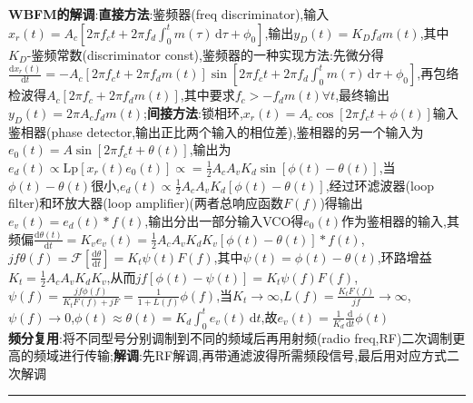 \documentclass[UTF8,a4paper,10pt]{article}
\begin{document}
\begin{multicols}{2}
    \textbf{WBFM的解调}:\textbf{直接方法}:鉴频器(freq discriminator),输入$x_r(t)=A_c[2\pi f_ct+2\pi f_d\int_0^tm(\tau)\,\mathrm{d}\tau+\phi_0]$,输出$y_D(t)=K_Df_dm(t)$,其中$K_D$-鉴频常数(discriminator const),鉴频器的一种实现方法:先微分得$\frac{\mathrm{d}x_r(t)}{\mathrm{d}t}=-A_c[2\pi f_ct+2\pi f_dm(t)]\sin[2\pi f_ct+2\pi f_d\int_0^tm(\tau)\,\mathrm{d}\tau+\phi_0]$,再包络检波得$A_c[2\pi f_c+2\pi f_dm(t)]$,其中要求$f_c>-f_dm(t)\forall t$,最终输出$y_D(t)=2\pi A_cf_dm(t)$;\textbf{间接方法}:锁相环,$x_r(t)=A_c\cos[2\pi f_ct+\phi(t)]$输入鉴相器(phase detector,输出正比两个输入的相位差),鉴相器的另一个输入为$e_0(t)=A\sin[2\pi f_ct+\theta(t)]$,输出为$e_d(t)\propto\text{Lp}[x_r(t)e_0(t)]\propto=\frac{1}{2}A_cA_vK_d\sin[\phi(t)-\theta(t)]$,当$\phi(t)-\theta(t)$很小,$e_d(t)\propto\frac{1}{2}A_cA_vK_d[\phi(t)-\theta(t)]$,经过环滤波器(loop filter)和环放大器(loop amplifier)(两者总响应函数$F(f)$)得输出$e_v(t)=e_d(t)*f(t)$,输出分出一部分输入VCO得$e_0(t)$作为鉴相器的输入,其频偏$\frac{\mathrm{d}\theta(t)}{\mathrm{d}t}=K_ve_v(t)=\frac{1}{2}A_cA_vK_dK_v[\phi(t)-\theta(t)]*f(t)$,$jf\theta(f)=\mathscr{F}[\frac{\mathrm{d}\theta}{\mathrm{d}t}]=K_t\psi(t)F(f)$,其中$\psi(t)=\phi(t)-\theta(t)$,环路增益$K_t=\frac{1}{2}A_cA_vK_dK_v$,从而$jf[\phi(t)-\psi(t)]=K_t\psi(f)F(f)$,$\psi(f)=\frac{jf\phi(f)}{K_tF(f)+jF}=\frac{1}{1+L(f)}\phi(f)$,当$K_t\rightarrow\infty$,$L(f)=\frac{K_tF(f)}{jf}\rightarrow\infty$,$\psi(f)\rightarrow 0$,$\phi(t)\approx\theta(t)=K_d\int_0^te_v(t)\,\mathrm{d}t$,故$e_v(t)=\frac{1}{K_d}\frac{\mathrm{d}}{\mathrm{d}t}\phi(t)$\\
    \textbf{频分复用}:将不同型号分别调制到不同的频域后再用射频(radio freq,RF)二次调制更高的频域进行传输;\textbf{解调}:先RF解调,再带通滤波得所需频段信号,最后用对应方式二次解调\\%
    \rule{\columnwidth}{.5pt}
\end{multicols}
\end{document}
